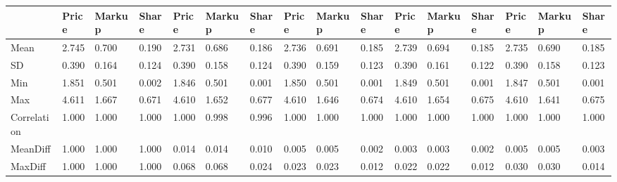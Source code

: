\begin{table}[htbp]
\begin{tabular}{llllllllllllllll} \hline \hline
 & Price  & Markup  & Share  & Price  & Markup  & Share  & Price  & Markup  & Share  & Price  & Markup  & Share  & Price  & Markup  & Share  \\  \hline 
Mean &     2.745 &     0.700 &     0.190 &     2.731 &     0.686 &     0.186 &     2.736 &     0.691 &     0.185 &     2.739 &     0.694 &     0.185 &     2.735 &     0.690 &     0.185 \\  
SD &     0.390 &     0.164 &     0.124 &     0.390 &     0.158 &     0.124 &     0.390 &     0.159 &     0.123 &     0.390 &     0.161 &     0.122 &     0.390 &     0.158 &     0.123 \\  
Min &     1.851 &     0.501 &     0.002 &     1.846 &     0.501 &     0.001 &     1.850 &     0.501 &     0.001 &     1.849 &     0.501 &     0.001 &     1.847 &     0.501 &     0.001 \\  
Max &     4.611 &     1.667 &     0.671 &     4.610 &     1.652 &     0.677 &     4.610 &     1.646 &     0.674 &     4.610 &     1.654 &     0.675 &     4.610 &     1.641 &     0.675 \\  
Correlation &     1.000 &     1.000 &     1.000 &     1.000 &     0.998 &     0.996 &     1.000 &     1.000 &     1.000 &     1.000 &     1.000 &     1.000 &     1.000 &     1.000 &     1.000 \\  
MeanDiff &     1.000 &     1.000 &     1.000 &     0.014 &     0.014 &     0.010 &     0.005 &     0.005 &     0.002 &     0.003 &     0.003 &     0.002 &     0.005 &     0.005 &     0.003 \\  
MaxDiff &     1.000 &     1.000 &     1.000 &     0.068 &     0.068 &     0.024 &     0.023 &     0.023 &     0.012 &     0.022 &     0.022 &     0.012 &     0.030 &     0.030 &     0.014 \\  
\hline \hline \end{tabular}
\end{table}
